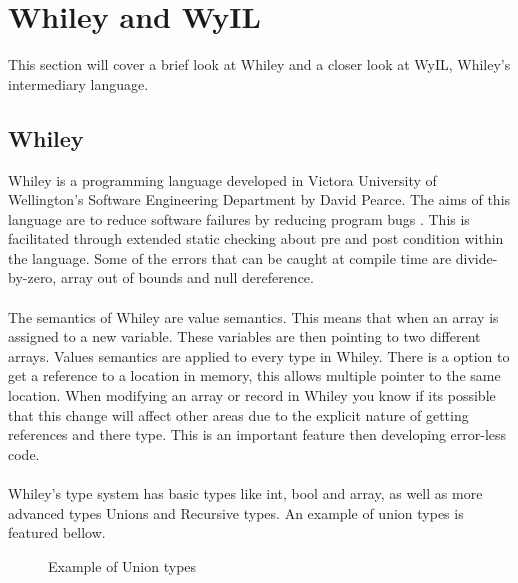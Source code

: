 \section{Whiley and WyIL}

This section will cover a brief look at Whiley and a closer look at WyIL, Whiley's intermediary language.

\subsection{Whiley}\label{subsec:wy}
Whiley is a programming language developed in Victora University of Wellington's Software Engineering Department by David Pearce. The aims of this language are to reduce software failures by reducing program bugs \cite{2_pearce_2016}. This is facilitated through extended static checking \cite{2_pearce_2016} about pre and post condition within the language. Some of the errors that can be caught at compile time are divide-by-zero, array out of bounds and null dereference\cite{2_pearce_2016}.

\paragraph{}
The semantics of Whiley are value semantics. This means that when an array is assigned to a new variable. These variables are then pointing to two different arrays. Values semantics are applied to every type in Whiley. There is a option to get a reference to a location in memory, this allows multiple pointer to the same location. When modifying an array or record in Whiley you know if its possible that this change will affect other areas due to the explicit nature of getting references and there type. This is an important feature then developing error-less code.%

\paragraph{}
Whiley's type system has basic types like int, bool and array, as well as more advanced types Unions and Recursive types. An example of union types is featured bellow.
\begin{figure}[H]
  \centering
  
  \caption{Example of Union types}
  \label{fig:whiley}
\end{figure}

